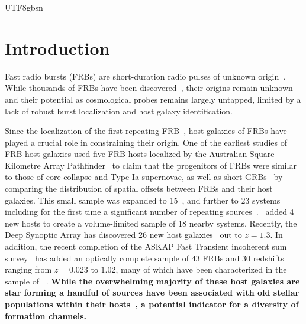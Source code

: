 \documentclass[twocolumn,linenumbers]{aastex631}
\newcommand{\msbold}[1]{\textbf{#1}}
\begin{document}
\begin{CJK*}{UTF8}{gbsn}

\section{Introduction}\label{sec:intro}
Fast radio bursts (FRBs) are short-duration radio pulses of unknown origin~\citep{cordes2019fast,petroff2022fast}. While thousands of FRBs have been discovered~\citep{collaboration2021first}, their origins remain unknown and their potential as cosmological probes remains largely untapped, limited by a lack of robust burst localization and host galaxy identification. 

Since the localization of the first repeating FRB~\citep{chatterjee2017direct,tendulkar2017host}, host galaxies of FRBs have played a crucial role in constraining their origin. One of the earliest studies of FRB host galaxies used five FRB hosts localized by the Australian Square Kilometre Array Pathfinder~\citep{macquart2020census} to claim that the progenitors of FRBs were similar to those of core-collapse and Type Ia supernovae, as well as short GRBs~\citep{heintz2020host,bhandari2020host} by comparing the distribution of spatial offsets between FRBs and their host galaxies. This small sample was expanded to 15~\citep{bhandari2022characterizing}, and further to 23 systems including for the first time a significant number of repeating sources~\citep{gordon2023demographics}.~\citet{bhardwaj2024host} added 4 new hosts to create a volume-limited sample of 18 nearby systems. Recently, the Deep Synoptic Array has discovered 26 new host galaxies~\citep{kocz2019dsa,law2024deep,sharma2024preferential,connor2024gas} out to $z = 1.3$. In addition, the recent completion of the ASKAP Fast Transient incoherent sum survey~\citep{shannon2024commensal} has added an optically complete sample of 43 FRBs and 30 redshifts ranging from $z = 0.023$ to $1.02$, many of which have been characterized in the sample of~\citet{gordon2023demographics} \citep[see also][]{gordon2023fast}. \msbold{While the overwhelming majority of these host galaxies are star forming a handful of sources have been associated with old stellar populations within their hosts~\citet{kirsten2022repeating, shah2024repeating,eftekhari2024massive}, a potential indicator for a diversity of formation channels.}


\end{CJK*}
\end{document}
